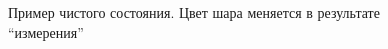 \begin{figure}
\centering



\caption{Пример чистого состояния. Цвет шара меняется в
  результате ``измерения''}
\label{figAddPureStateExample}
\end{figure}
